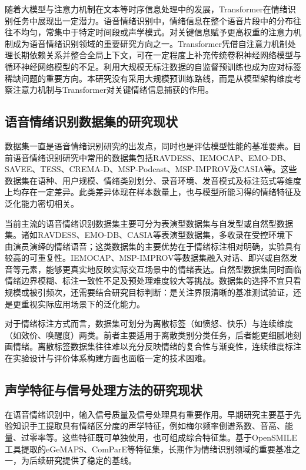 随着大模型与注意力机制在文本等时序信息处理中的发展，Transformer在情绪识别任务中展现出一定潜力。语音情绪识别中，情绪信息在整个语音片段中的分布往往不均匀，常集中于特定时间段或声学模式。对关键信息赋予更高权重的注意力机制成为语音情绪识别领域的重要研究方向之一\cite{mirsamadi2017automatic,chen2023dwformer,wang2024swin}。Transformer凭借自注意力机制处理长期依赖关系并整合全局上下文，可在一定程度上补充传统卷积神经网络模型与循环神经网络模型的不足\cite{liu2023dualrobustness}。利用大规模无标注数据的自监督预训练也成为应对标签稀缺问题的重要方向\cite{thanh2024robust,sampath2025efficient}。本研究没有采用大规模预训练路线，而是从模型架构维度考察注意力机制与Transformer对关键情绪信息捕获的作用。

\subsection{语音情绪识别数据集的研究现状}

数据集一直是语音情绪识别研究的出发点，同时也是评估模型性能的基准要素。目前语音情绪识别研究中常用的数据集包括RAVDESS、IEMOCAP、EMO-DB、SAVEE、TESS、CREMA-D、MSP-Podcast、MSP-IMPROV及CASIA等\cite{ma2023review,zhang2020transfer}。这些数据集在语种、用户规模、情绪类别划分、录音环境、发音模式及标注范式等维度上均存在一定差异。此类差异体现在样本数量上，也与模型所能习得的情绪特征及泛化能力密切相关。

当前主流的语音情绪识别数据集主要可分为表演型数据集与自发型或自然型数据集\cite{zhang2020transfer}。诸如RAVDESS、EMO-DB、CASIA等表演型数据集，多收录在受控环境下由演员演绎的情绪语音；这类数据集的主要优势在于情绪标注相对明确，实验具有较高的可重复性。IEMOCAP、MSP-IMPROV等数据集融入对话、即兴或自然发音等元素，能够更真实地反映实际交互场景中的情绪表达\cite{ma2023review}。自然型数据集同时面临情绪边界模糊、标注一致性不足及预处理难度较大等挑战。数据集的选择不宜只看规模或被引频次，还需要结合研究目标判断：是关注界限清晰的基准测试验证，还是更重视实际应用场景下的泛化能力。

对于情绪标注方式而言，数据集可划分为离散标签（如愤怒、快乐）与连续维度（如效价、唤醒度）两类。前者主要适用于离散类别分类任务，后者能更细腻地刻画情绪。离散标签数据集往往难以充分反映情绪的复合性与渐变性，连续维度标注在实验设计与评价体系构建方面也面临一定的技术困难\cite{ma2023review,zhang2020transfer}。

\subsection{声学特征与信号处理方法的研究现状}

在语音情绪识别中，输入信号质量及信号处理具有重要作用。早期研究主要基于先验知识手工提取具有情绪区分度的声学特征，例如梅尔频率倒谱系数、音高、能量、过零率等。这些特征既可单独使用，也可组成综合特征集。基于OpenSMILE工具提取的eGeMAPS、ComParE等特征集，长期作为情绪识别领域的重要基准之一，为后续研究提供了稳定的基线\cite{zhang2020transfer,ma2023review}。


